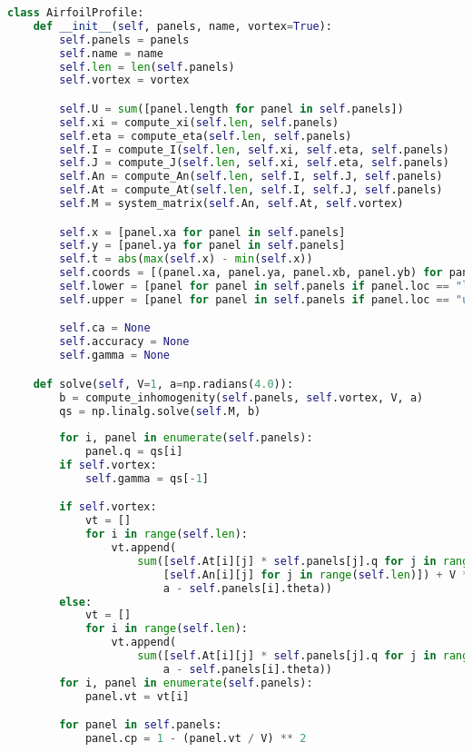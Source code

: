 \begin{lstlisting}[language=Python]
class AirfoilProfile:
    def __init__(self, panels, name, vortex=True):
        self.panels = panels
        self.name = name
        self.len = len(self.panels)
        self.vortex = vortex

        self.U = sum([panel.length for panel in self.panels])
        self.xi = compute_xi(self.len, self.panels)
        self.eta = compute_eta(self.len, self.panels)
        self.I = compute_I(self.len, self.xi, self.eta, self.panels)
        self.J = compute_J(self.len, self.xi, self.eta, self.panels)
        self.An = compute_An(self.len, self.I, self.J, self.panels)
        self.At = compute_At(self.len, self.I, self.J, self.panels)
        self.M = system_matrix(self.An, self.At, self.vortex)

        self.x = [panel.xa for panel in self.panels]
        self.y = [panel.ya for panel in self.panels]
        self.t = abs(max(self.x) - min(self.x))
        self.coords = [(panel.xa, panel.ya, panel.xb, panel.yb) for panel in self.panels]
        self.lower = [panel for panel in self.panels if panel.loc == "lower"]
        self.upper = [panel for panel in self.panels if panel.loc == "upper"]

        self.ca = None
        self.accuracy = None
        self.gamma = None

    def solve(self, V=1, a=np.radians(4.0)):
        b = compute_inhomogenity(self.panels, self.vortex, V, a)
        qs = np.linalg.solve(self.M, b)
        
        for i, panel in enumerate(self.panels):
            panel.q = qs[i]
        if self.vortex:
            self.gamma = qs[-1]

        if self.vortex:
            vt = []
            for i in range(self.len):
                vt.append(
                    sum([self.At[i][j] * self.panels[j].q for j in range(self.len)]) - self.gamma * sum(
                        [self.An[i][j] for j in range(self.len)]) + V * np.cos(
                        a - self.panels[i].theta))
        else:
            vt = []
            for i in range(self.len):
                vt.append(
                    sum([self.At[i][j] * self.panels[j].q for j in range(self.len)]) + V * np.cos(
                        a - self.panels[i].theta))
        for i, panel in enumerate(self.panels):
            panel.vt = vt[i]

        for panel in self.panels:
            panel.cp = 1 - (panel.vt / V) ** 2


\end{lstlisting}
